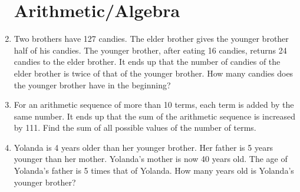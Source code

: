 \documentclass[11pt]{scrartcl}
\begin{document}
\begin{enumerate}
    \section{Arithmetic/Algebra}
    \item Two brothers have 127 candies. The elder brother gives the younger brother half of his candies. The younger brother, after eating 16 candies, returns 24 candies to the elder brother. It ends up that the number of candies of the elder brother is twice of that of the younger brother. How many candies does the younger brother have in the beginning?
    \vspace{10cm} \item For an arithmetic sequence of more than 10 terms, each term is added by the same number. It ends up that the sum of the arithmetic sequence is increased by 111. Find the sum of all possible values of the number of terms.
    \vspace{10cm} \item Yolanda is 4 years older than her younger brother. Her father is 5 years younger than her mother. Yolanda's mother is now 40 years old. The age of Yolanda's father is 5 times that of Yolanda. How many years old is Yolanda's younger brother?

\end{enumerate}
\end{document}
